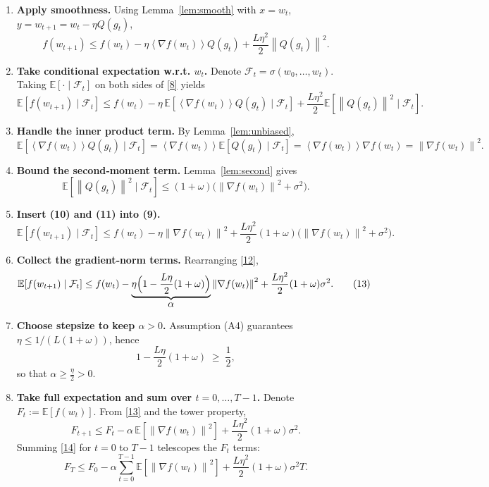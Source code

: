 \documentclass{article}
\newcommand{\EE}{\mathbb{E}}
\newcommand{\norm}[1]{\left\lVert#1\right\rVert}
\newcommand{\inner}[1]{\left\langle#1\right\rangle}
\begin{document}
\begin{enumerate}[label=[Step \arabic*], leftmargin=*, itemsep=4pt]
\item \textbf{Apply smoothness.}  
Using Lemma~\ref{lem:smooth} with $x=w_t$, $y=w_{t+1}=w_t-\eta Q(g_t)$,
\[
f(w_{t+1})\le f(w_t)-\eta\inner{\nabla f(w_t)}{Q(g_t)}+\frac{L\eta^{2}}{2}\norm{Q(g_t)}^{2}.
\tag{8}
\]

\item \textbf{Take conditional expectation w.r.t. $w_t$.}  
Denote $\mathcal{F}_t=\sigma(w_0,\dots,w_t)$. Taking $\EE[\cdot\mid\mathcal{F}_t]$ on both sides of \eqref{8} yields
\[
\EE\!\left[f(w_{t+1})\mid\mathcal{F}_t\right]
\le f(w_t)-\eta\,\EE\!\left[\inner{\nabla f(w_t)}{Q(g_t)}\mid\mathcal{F}_t\right]
      +\frac{L\eta^{2}}{2}\EE\!\left[\norm{Q(g_t)}^{2}\mid\mathcal{F}_t\right].
\tag{9}
\]

\item \textbf{Handle the inner product term.}  
By Lemma~\ref{lem:unbiased},
\[
\EE\!\left[\inner{\nabla f(w_t)}{Q(g_t)}\mid\mathcal{F}_t\right]
 =\inner{\nabla f(w_t)}{\EE[Q(g_t)\mid\mathcal{F}_t]}
 =\inner{\nabla f(w_t)}{\nabla f(w_t)}
 =\norm{\nabla f(w_t)}^{2}.
\tag{10}
\]

\item \textbf{Bound the second‑moment term.}  
Lemma~\ref{lem:second} gives
\[
\EE\!\left[\norm{Q(g_t)}^{2}\mid\mathcal{F}_t\right]
\le (1+\omega)\bigl(\norm{\nabla f(w_t)}^{2}+\sigma^{2}\bigr).
\tag{11}
\]

\item \textbf{Insert (10) and (11) into (9).}  
\[
\EE\!\left[f(w_{t+1})\mid\mathcal{F}_t\right]
\le f(w_t)-\eta\norm{\nabla f(w_t)}^{2}
   +\frac{L\eta^{2}}{2}(1+\omega)\bigl(\norm{\nabla f(w_t)}^{2}+\sigma^{2}\bigr).
\tag{12}
\]

\item \textbf{Collect the gradient‑norm terms.}  
Rearranging \eqref{12},
\[
\EE\!\left[f(w_{t+1})\mid\mathcal{F}_t\right]
\le f(w_t)-\underbrace{\eta\Bigl(1-\frac{L\eta}{2}(1+\omega)\Bigr)}_{\displaystyle \alpha}
   \norm{\nabla f(w_t)}^{2}
   +\frac{L\eta^{2}}{2}(1+\omega)\sigma^{2}.
\tag{13}
\]

\item \textbf{Choose stepsize to keep $\alpha>0$.}  
Assumption (A4) guarantees $\eta\le 1/(L(1+\omega))$, hence
\[
1-\frac{L\eta}{2}(1+\omega)\;\ge\;\frac12,
\]
so that $\alpha\ge \frac{\eta}{2}>0$.

\item \textbf{Take full expectation and sum over $t=0,\dots,T-1$.}  
Denote $F_t:=\EE[f(w_t)]$. From \eqref{13} and the tower property,
\[
F_{t+1}\le F_t-\alpha\,\EE\!\left[\norm{\nabla f(w_t)}^{2}\right]
          +\frac{L\eta^{2}}{2}(1+\omega)\sigma^{2}.
\tag{14}
\]
Summing \eqref{14} for $t=0$ to $T-1$ telescopes the $F_t$ terms:
\[
F_T\le F_0-\alpha\sum_{t=0}^{T-1}\EE\!\left[\norm{\nabla f(w_t)}^{2}\right]
      +\frac{L\eta^{2}}{2}(1+\omega)\sigma^{2}T.
\tag{15}
\]


\end{enumerate}
\end{document}

